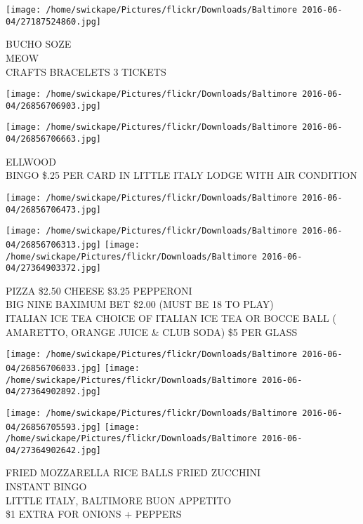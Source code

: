 \documentclass[10pt,letterpaper]{article}
\begin{document}
\texttt{[image: /home/swickape/Pictures/flickr/Downloads/Baltimore 2016-06-04/27187524860.jpg]}

BUCHO SOZE\\
MEOW\\
CRAFTS BRACELETS 3 TICKETS\\
\pagebreak

\texttt{[image: /home/swickape/Pictures/flickr/Downloads/Baltimore 2016-06-04/26856706903.jpg]}

\vspace{0.25in}
\texttt{[image: /home/swickape/Pictures/flickr/Downloads/Baltimore 2016-06-04/26856706663.jpg]}

ELLWOOD\\
BINGO \$.25 PER CARD IN LITTLE ITALY LODGE WITH AIR CONDITION\\
\pagebreak

\texttt{[image: /home/swickape/Pictures/flickr/Downloads/Baltimore 2016-06-04/26856706473.jpg]}

\vspace{0.25in}
\texttt{[image: /home/swickape/Pictures/flickr/Downloads/Baltimore 2016-06-04/26856706313.jpg]}
\texttt{[image: /home/swickape/Pictures/flickr/Downloads/Baltimore 2016-06-04/27364903372.jpg]}

PIZZA \$2.50 CHEESE \$3.25 PEPPERONI\\
BIG NINE BAXIMUM BET \$2.00 (MUST BE 18 TO PLAY)\\
ITALIAN ICE TEA CHOICE OF ITALIAN ICE TEA OR BOCCE BALL ( AMARETTO, ORANGE JUICE \& CLUB SODA) \$5 PER GLASS\\
\pagebreak

\texttt{[image: /home/swickape/Pictures/flickr/Downloads/Baltimore 2016-06-04/26856706033.jpg]}
\texttt{[image: /home/swickape/Pictures/flickr/Downloads/Baltimore 2016-06-04/27364902892.jpg]}

\texttt{[image: /home/swickape/Pictures/flickr/Downloads/Baltimore 2016-06-04/26856705593.jpg]}
\texttt{[image: /home/swickape/Pictures/flickr/Downloads/Baltimore 2016-06-04/27364902642.jpg]}

FRIED MOZZARELLA RICE BALLS FRIED ZUCCHINI\\
INSTANT BINGO\\
LITTLE ITALY, BALTIMORE BUON APPETITO\\
\$1 EXTRA FOR ONIONS + PEPPERS\\
\pagebreak
\end{document}
